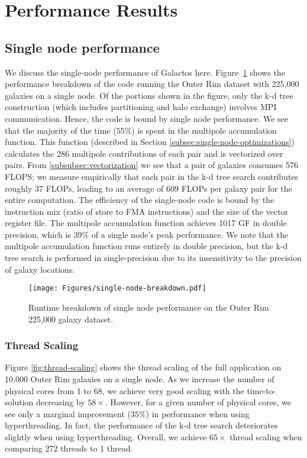 \section{Performance Results}
\subsection{Single node performance}
\label{sec:single-node-performance}

We discuss the single-node performance of Galactos here.
Figure~\ref{fig:single-node} shows the performance breakdown of the code
running the Outer Rim dataset with 225,000 galaxies on a single node. Of the
portions shown in the figure, only the k-d tree construction (which includes
partitioning and halo exchange) involves MPI communication. Hence, the code is
bound by single node performance. We see that the majority of the time ($55\%$)
is spent in the multipole accumulation function. This function (described in
Section \ref{subsec:single-node-optimizations}) calculates the 286 multipole
contributions of each pair and is vectorized over pairs. From
\ref{subsubsec:vectorization} we see that a pair of galaxies consumes 576 FLOPS; we
measure empirically that each pair in the k-d tree search contributes roughly
37 FLOPs, leading to an average of 609 FLOPs per galaxy pair for the entire
computation. The efficiency of the single-node code is bound by the instruction
mix (ratio of store to FMA instructions) and the size of the vector register
file. The multipole accumulation function achieves 1017 GF in double precision,
which is $39\%$ of a single node's peak performance. We note that the multipole
accumulation function runs entirely in double precision, but the k-d tree
search is performed in single-precision due to its insensitivity to the precision
of galaxy locations.

\begin{figure}
\centering
\texttt{[image: Figures/single-node-breakdown.pdf]}
    \caption{Runtime breakdown of single node performance on the Outer Rim 225,000 galaxy dataset.}
\label{fig:single-node}
\end{figure}




\subsubsection{Thread Scaling}

Figure \ref{fig:thread-scaling} shows the thread scaling of the full application on 10,000 Outer Rim galaxies on a single node. As we increase the number of physical cores from 1 to 68, we achieve very good scaling with the time-to-solution decreasing by $58\times$. However, for a given number of physical cores, we see only a marginal improvement ($35\%$) in performance when using hyperthreading.
In fact, the performance of the k-d tree search deteriorates slightly when using hyperthreading. Overall, we achieve $65\times$ thread scaling when comparing 272 threads to 1 thread.

